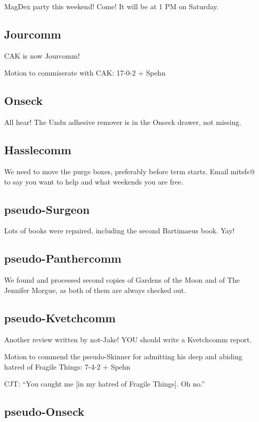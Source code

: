 \documentclass[10pt]{article}
\begin{document}
MagDex party this weekend!  Come!  It will be at 1 PM on Saturday.

\subsection*{Jourcomm}

CAK is now Jourcomm!

Motion to commiserate with CAK: 17-0-2 + Spehn

\subsection*{Onseck}

All hear!  The Undu adhesive remover is in the Onseck drawer, not missing.

\subsection*{Hasslecomm}

We need to move the purge boxes, preferably before term starts.  Email mitsfs@ to say you want to help and what weekends you are free.

\subsection*{pseudo-Surgeon}

Lots of books were repaired, including the second Bartimaeus book.  Yay!

\subsection*{pseudo-Panthercomm}

We found and processed second copies of Gardens of the Moon and of The Jennifer Morgue, as both of them are always checked out.

\subsection*{pseudo-Kvetchcomm}

Another review written by not-Jake!  YOU should write a Kvetchcomm report.

Motion to commend the pseudo-Skinner for admitting his deep and abiding hatred of Fragile Things: 7-4-2 + Spehn

CJT: ``You caught me [in my hatred of Fragile Things].  Oh no.''

\subsection*{pseudo-Onseck}
\end{document}
